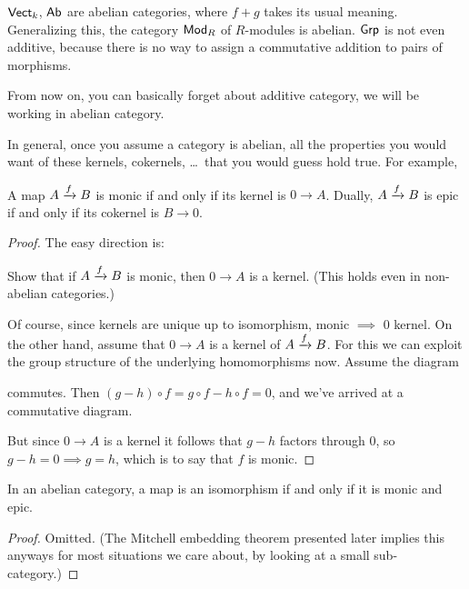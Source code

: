 \begin{example}
	\listhack
	\begin{enumerate}[(a)]
		\ii $\mathsf{Vect}_k$, $\mathsf{Ab}$ are abelian categories,
		where $f+g$ takes its usual meaning.
		\ii Generalizing this, the category $\mathsf{Mod}_R$ of $R$-modules is abelian.
		\ii $\mathsf{Grp}$ is not even additive, because there is no way to assign
		a commutative addition to pairs of morphisms.
	\end{enumerate}
\end{example}

From now on, you can basically forget about additive category, we will be working in abelian
category.

In general, once you assume a category is abelian, all the properties you would want
of these kernels, cokernels, \dots\ that you would guess hold true.
For example,
\begin{proposition}
	A map $A \xrightarrow{f} B$ is monic if and only if its kernel is $0 \to A$.
	Dually, $A \xrightarrow{f} B$ is epic if and only if its cokernel is $B \to 0$.
\end{proposition}
\begin{proof}
	The easy direction is:
	\begin{exercise}
		Show that if $A \xrightarrow{f} B$ is monic, then $0 \to A$ is a kernel.
		(This holds even in non-abelian categories.)
	\end{exercise}
	Of course, since kernels are unique up to isomorphism, monic $\implies$ $0$ kernel.
	On the other hand, assume that $0 \to A$ is a kernel of $A \xrightarrow{f} B$.
	For this we can exploit the group structure of the underlying homomorphisms now.
	Assume the diagram
	\begin{center}
	\end{center}
	commutes.
	Then $(g - h) \circ f = g \circ f - h \circ f = 0$, and we've arrived at a commutative diagram.
	\begin{center}
	\end{center}
	But since $0 \to A$ is a kernel it follows that $g-h$ factors through $0$,
	so $g-h = 0 \implies g = h$, which is to say that $f$ is monic.
\end{proof}
\begin{proposition}
	In an abelian category,
	a map is an isomorphism if and only if it is monic and epic.
\end{proposition}
\begin{proof}
	Omitted. (The Mitchell embedding theorem
	presented later implies this anyways for
	most situations we care about,
	by looking at a small sub-category.)
\end{proof}

